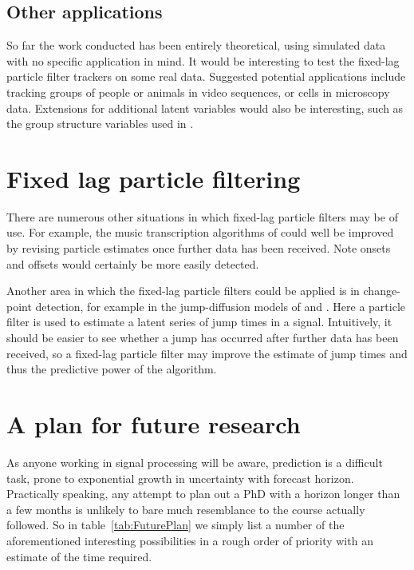 \subsection{Other applications}
So far the work conducted has been entirely theoretical, using simulated data with no specific application in mind. It would be interesting to test the fixed-lag particle filter trackers on some real data. Suggested potential applications include tracking groups of people or animals in video sequences, or cells in microscopy data. Extensions for additional latent variables would also be interesting, such as the group structure variables used in \cite{Pang2011}.



\section{Fixed lag particle filtering}
There are numerous other situations in which fixed-lag particle filters may be of use. For example, the music transcription algorithms of \cite{Bunch2010} could well be improved by revising particle estimates once further data has been received. Note onsets and offsets would certainly be more easily detected.

Another area in which the fixed-lag particle filters could be applied is in change-point detection, for example in the jump-diffusion models of \cite{Godsill2007a} and \cite{Christensen2012}. Here a particle filter is used to estimate a latent series of jump times in a signal. Intuitively, it should be easier to see whether a jump has occurred after further data has been received, so a fixed-lag particle filter may improve the estimate of jump times and thus the predictive power of the algorithm.



\section{A plan for future research}
As anyone working in signal processing will be aware, prediction is a difficult task, prone to exponential growth in uncertainty with forecast horizon. Practically speaking, any attempt to plan out a PhD with a horizon longer than a few months is unlikely to bare much resemblance to the course actually followed. So in table~\ref{tab:FuturePlan} we simply list a number of the aforementioned interesting possibilities in a rough order of priority with an estimate of the time required.

